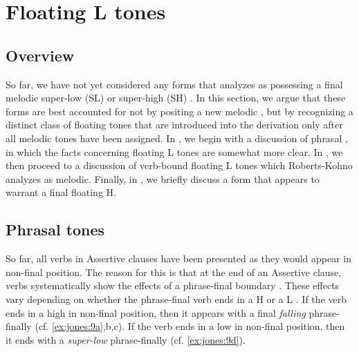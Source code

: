 \documentclass[output=paper,newtxmath,modfonts,nonflat,hidelinks]{langsci/langscibook}
\begin{document}
\section{Floating L tones}\label{sec:jones:4}
\subsection{Overview}\label{sec:jones:4.1}

So far, we have not yet considered any forms that \citet{Roberts-Kohno2014} analyzes as possessing a final melodic super-low (SL) or super-high (SH) . In this section, we argue that these forms are best accounted for not by positing a new melodic , but by recognizing a distinct class of floating tones that are introduced into the derivation only after all melodic tones have been assigned. In , we begin with a discussion of phrasal , in which the facts concerning floating L tones are somewhat more clear. In , we then proceed to a discussion of verb-bound floating L tones which Roberts-Kohno analyzes as melodic. Finally, in , we briefly discuss a form that appears to warrant a final floating H.

\subsection{Phrasal tones}\label{sec:jones:4.2}

So far, all verbs in Assertive clauses have been presented as they would appear in non-final position. The reason for this is that at the end of an Assertive clause, verbs systematically show the effects of a phrase-final boundary . These effects vary depending on whether the phrase-final verb ends in a H  or a L . If the verb ends in a high  in non-final position, then it appears with a final \textit{falling}  phrase-finally (cf. \ref{ex:jones:9a},b,c). If the verb ends in a low  in non-final position, then it ends with a \textit{super-low}  phrase-finally (cf. \ref{ex:jones:9d}).
\end{document}
